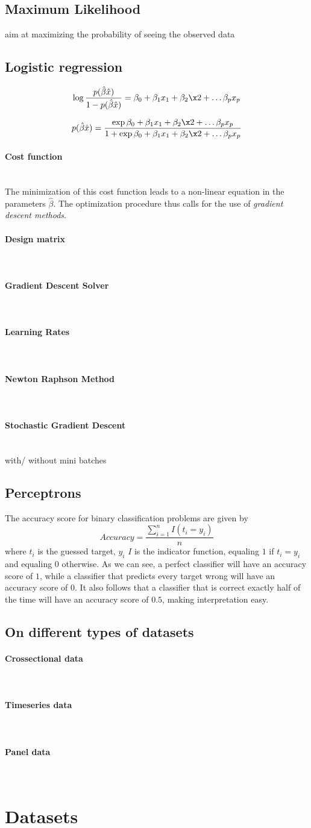 \documentclass[10pt, a4paper, twocolumn]{article}
\newcommand{\myparagraph}[1]{\paragraph{#1}\mbox{}\\}
\begin{document}
	\subsection{Maximum Likelihood}
		aim at maximizing the probability of seeing the observed data
		
	\subsection{Logistic regression}
		$$\log{\frac{p(\hat{\beta}\hat{x})}{1-p(\hat{\beta}\hat{x})}}=\beta_0+\beta_1x_1+\beta_2\x2+\dots\beta_px_p$$
		
		$$p(\hat{\beta}\hat{x}) = \frac{\exp{\beta_0+\beta_1x_1+\beta_2\x2+\dots\beta_px_p}}{1+\exp{\beta_0+\beta_1x_1+\beta_2\x2+\dots\beta_px_p}}$$

		\myparagraph{Cost function}
			The minimization of this cost function leads to a non-linear equation in the parameters $\hat{\beta}$. The optimization procedure thus calls for the use of \emph{gradient descent methods}.
		\myparagraph{Design matrix}
		\myparagraph{Gradient Descent Solver}
		\myparagraph{Learning Rates}
		\myparagraph{Newton Raphson Method}
		
		\myparagraph{Stochastic Gradient Descent}
			with/ without mini batches
		
	\subsection{Perceptrons}
	
	The accuracy score for binary classification problems are given by
		$$Accuracy=\frac{\sum_{i=1}^nI(t_i=y_i)}{n}$$
	where $t_i$ is the guessed target, $y_i$ $I$ is the indicator function, equaling $1$ if $t_i=y_i$ and equaling $0$ otherwise.
	As we can see, a perfect classifier will have an accuracy score of $1$, while a classifier that predicts every target wrong will have an accuracy score of $0$. It also follows that a classifier that is correct exactly half of the time will have an accuracy score of $0.5$, making interpretation easy.
	\subsection{On different types of datasets}
		\myparagraph{Crossectional data}
		\myparagraph{Timeseries data}
		\myparagraph{Panel data}
\section{Datasets}
\end{document}
